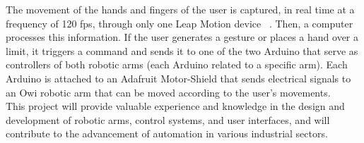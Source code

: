 The  movement  of  the  hands  and  fingers  of  the  user  is captured, in real time at a  frequency  of  120  fps, through only one Leap  Motion  device ~\cite{Motion}. Then,  a  computer  processes  this information.  If  the user  generates  a  gesture  or  places a  hand over a  limit,  it  triggers  a  command and sends  it  to  one of  the two  Arduino  that  serve  as  controllers  of  both  robotic  arms (each  Arduino  related  to  a  specific  arm).  Each  Arduino  is attached  to an  Adafruit  Motor-Shield \cite{Shield}  that  sends  electrical signals to  an  Owi robotic arm that  can be  moved according to the user's movements.\\
This project will provide valuable experience and knowledge in the design and development of robotic arms, control systems, and user interfaces, and will contribute to the advancement of automation in various industrial sectors.\\